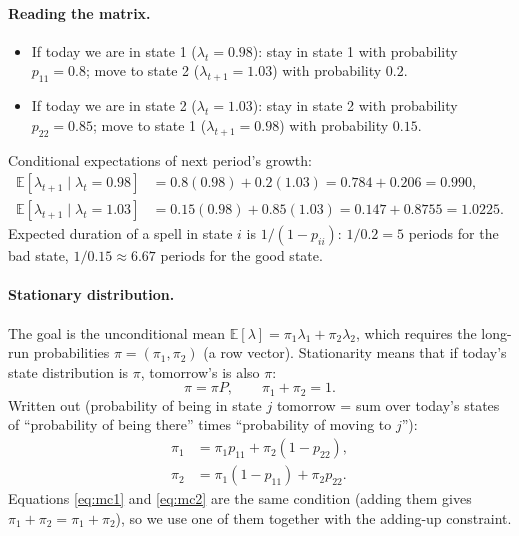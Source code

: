 \paragraph{Reading the matrix.}
\begin{itemize}
\item If today we are in state 1 ($\lambda_t=0.98$): stay in state 1 with probability $p_{11}=0.8$; move to state 2 ($\lambda_{t+1}=1.03$) with probability $0.2$.
\item If today we are in state 2 ($\lambda_t=1.03$): stay in state 2 with probability $p_{22}=0.85$; move to state 1 ($\lambda_{t+1}=0.98$) with probability $0.15$.
\end{itemize}
Conditional expectations of next period's growth:
\begin{align*}
\mathbb{E}[\lambda_{t+1}\mid\lambda_t=0.98]&=0.8(0.98)+0.2(1.03)=0.784+0.206=0.990,\\
\mathbb{E}[\lambda_{t+1}\mid\lambda_t=1.03]&=0.15(0.98)+0.85(1.03)=0.147+0.8755=1.0225.
\end{align*}
Expected duration of a spell in state $i$ is $1/(1-p_{ii})$: $1/0.2=5$ periods for the bad state, $1/0.15\approx6.67$ periods for the good state.

\paragraph{Stationary distribution.} The goal is the unconditional mean $\mathbb{E}[\lambda]=\pi_1\lambda_1+\pi_2\lambda_2$, which requires the long-run probabilities $\pi=(\pi_1,\pi_2)$ (a row vector). Stationarity means that if today's state distribution is $\pi$, tomorrow's is also $\pi$:
\[
\pi=\pi P,\qquad \pi_1+\pi_2=1.
\]
Written out (probability of being in state $j$ tomorrow = sum over today's states of ``probability of being there'' times ``probability of moving to $j$''):
\begin{align}
\pi_1&=\pi_1p_{11}+\pi_2(1-p_{22}),\label{eq:mc1}\\
\pi_2&=\pi_1(1-p_{11})+\pi_2p_{22}.\label{eq:mc2}
\end{align}
Equations \eqref{eq:mc1} and \eqref{eq:mc2} are the same condition (adding them gives $\pi_1+\pi_2=\pi_1+\pi_2$), so we use one of them together with the adding-up constraint.

